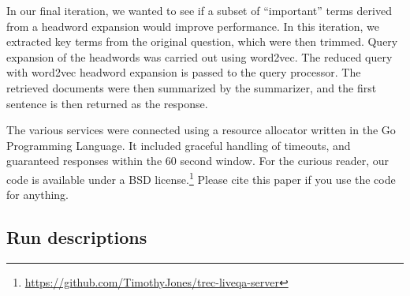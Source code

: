\documentclass[a4paper,10pt,conference,compsocconf,final]{IEEEtran}
\newcommand\method[1]{{\sf\small{#1}}}
\begin{document}
In our final iteration, we wanted to see if a subset of ``important''
terms derived from a headword expansion would improve performance.
In this iteration, we extracted key terms from the original question,
which were then trimmed.
Query expansion of the headwords was carried out using {\method{word2vec}}.
The reduced query with {\method{word2vec}} headword expansion is
passed to the query processor.
The retrieved documents were then summarized by the summarizer, and
the first sentence is then returned as the response.

The various services were connected using a resource allocator
written in the Go Programming Language.
It included graceful handling of timeouts, and guaranteed responses
within the 60 second window.
For the curious reader, our code is available under a BSD
license.\footnote{\url{https://github.com/TimothyJones/trec-liveqa-server}}
Please cite this paper if you use the code for anything.

\subsection{Run descriptions}
\label{sec:runs}
\end{document}
